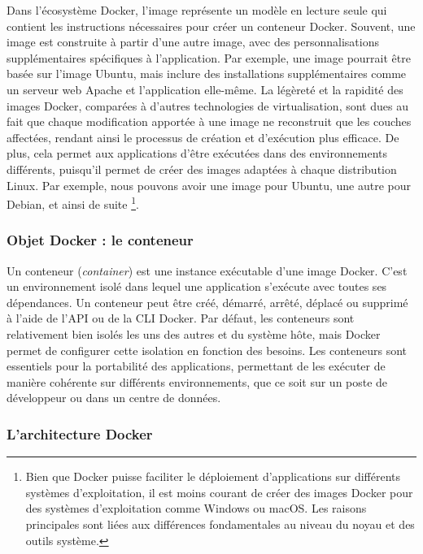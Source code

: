         Dans l'écosystème Docker, l'image représente un modèle en lecture seule qui contient les instructions nécessaires pour créer un conteneur Docker. Souvent, une image est construite à partir d'une autre image, avec des personnalisations supplémentaires spécifiques à l'application. Par exemple, une image pourrait être basée sur l'image Ubuntu, mais inclure des installations supplémentaires comme un serveur web Apache et l'application elle-même. La légèreté et la rapidité des images Docker, comparées à d'autres technologies de virtualisation, sont dues au fait que chaque modification apportée à une image ne reconstruit que les couches affectées, rendant ainsi le processus de création et d'exécution plus efficace. De plus, cela permet aux applications d'être exécutées dans des environnements différents, puisqu'il permet de créer des images adaptées à chaque distribution Linux. Par exemple, nous pouvons avoir une image pour Ubuntu, une autre pour Debian, et ainsi de suite \footnote{Bien que Docker puisse faciliter le déploiement d'applications sur différents systèmes d'exploitation, il est moins courant de créer des images Docker pour des systèmes d'exploitation comme Windows ou macOS. Les raisons principales sont liées aux différences fondamentales au niveau du noyau et des outils système.}.
        
        \subsubsection{Objet Docker : le conteneur}
        
        Un conteneur (\textit{container}) est une instance exécutable d'une image Docker. C'est un environnement isolé dans lequel une application s'exécute avec toutes ses dépendances. Un conteneur peut être créé, démarré, arrêté, déplacé ou supprimé à l'aide de l'API ou de la CLI Docker. Par défaut, les conteneurs sont relativement bien isolés les uns des autres et du système hôte, mais Docker permet de configurer cette isolation en fonction des besoins. Les conteneurs sont essentiels pour la portabilité des applications, permettant de les exécuter de manière cohérente sur différents environnements, que ce soit sur un poste de développeur ou dans un centre de données.

        \subsubsection{L'architecture Docker}
        
